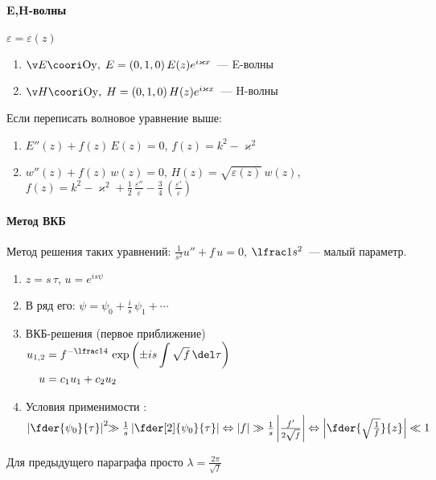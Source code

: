 \documentclass[draft]{trchesh}
\begin{document}
\begin{multicols*}{3}
\paragraph{E,H-волны}
$\varepsilon = \varepsilon(z)$
\begin{enumerate}
  \item $\v E \coori \mathrm{Oy},\; E = (0,1,0)\, E(z) e^{i \varkappa x}$~--- E-волны
  \item $\v H \coori \mathrm{Oy},\; H = (0,1,0)\, H(z) e^{i \varkappa x}$~--- H-волны
\end{enumerate}
Если переписать волновое уравнение выше:
\begin{enumerate}
  \item $E''(z) + f(z) \, E(z) = 0$, $f(z) = k^2 - \varkappa^2$
  \item $w''(z) + f(z) \, w(z) = 0$, $H(z) = \sqrt{\varepsilon(z)}\, w(z)$,
    $f(z) = k^2 - \varkappa^2
    + \frac 12\, \frac{\varepsilon''}{\varepsilon} 
    - \frac 34\, \left(\frac{\varepsilon'}{\varepsilon}\right)$
\end{enumerate}
\paragraph{Метод ВКБ}
Метод решения таких уравнений: $\frac 1{s^2} u'' + f\, u = 0$, $\lfrac 1{s^2}$~--- малый параметр.
\begin{enumerate}
  \item $z = s\,\tau$, $u = e^{is \psi}$ 
  \item В ряд его: $\psi = \psi_0 + \frac is\,\psi_1 + \dotsb $
  \item ВКБ-решения (первое приближение)
    $
    \begin{aligned}
      u_{1,2} &= f^{-\lfrac 14}\, \exp \left({\pm is\int\sqrt{f}\, \del \tau}\right)\\
      u       &= c_1 u_1 + c_2 u_2
    \end{aligned}
    $
  \item Условия применимости \quest:\\ 
    $
    \left\lvert \fder{\psi_0}{\tau} \right\rvert^2 \!\!\gg
    \frac{1}{s} \left\lvert\fder[2]{\psi_0}{\tau}\right\rvert
    \Leftrightarrow 
    |f| \gg \frac 1s \left\lvert \frac{f'}{2\sqrt f} \right\rvert
    \Leftrightarrow 
    \left\lvert \fder{{\sqrt \frac 1f}}{z} \right\rvert \ll 1
    $
\end{enumerate}
Для предыдущего параграфа просто $ \lambda = \frac{2 \pi}{\sqrt{f}}$


\end{multicols*}
\end{document}
